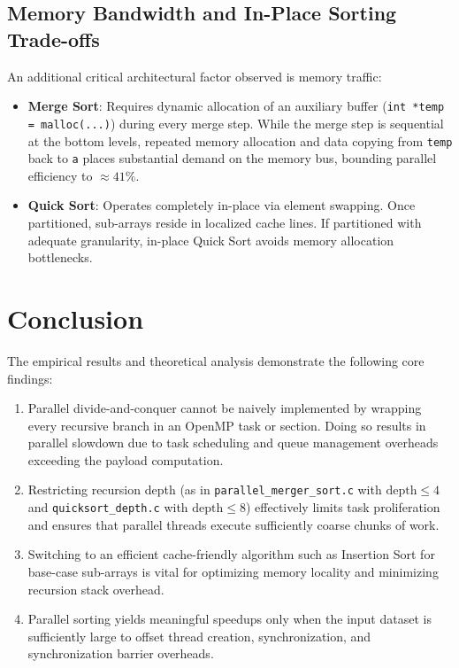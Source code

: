 \documentclass[12pt]{article}
\begin{document}
\subsection{Memory Bandwidth and In-Place Sorting Trade-offs}
An additional critical architectural factor observed is memory traffic:
\begin{itemize}
    \item \textbf{Merge Sort}: Requires dynamic allocation of an auxiliary buffer (\texttt{int *temp = malloc(...)}) during every merge step. While the merge step is sequential at the bottom levels, repeated memory allocation and data copying from \texttt{temp} back to \texttt{a} places substantial demand on the memory bus, bounding parallel efficiency to $\approx 41\%$.
    \item \textbf{Quick Sort}: Operates completely in-place via element swapping. Once partitioned, sub-arrays reside in localized cache lines. If partitioned with adequate granularity, in-place Quick Sort avoids memory allocation bottlenecks.
\end{itemize}

\section{Conclusion}
The empirical results and theoretical analysis demonstrate the following core findings:
\begin{enumerate}
    \item Parallel divide-and-conquer cannot be naively implemented by wrapping every recursive branch in an OpenMP task or section. Doing so results in parallel slowdown due to task scheduling and queue management overheads exceeding the payload computation.
    \item Restricting recursion depth (as in \texttt{parallel\_merger\_sort.c} with $\text{depth} \le 4$ and \texttt{quicksort_depth.c} with $\text{depth} \le 8$) effectively limits task proliferation and ensures that parallel threads execute sufficiently coarse chunks of work.
    \item Switching to an efficient cache-friendly algorithm such as Insertion Sort for base-case sub-arrays is vital for optimizing memory locality and minimizing recursion stack overhead.
    \item Parallel sorting yields meaningful speedups only when the input dataset is sufficiently large to offset thread creation, synchronization, and synchronization barrier overheads.
\end{enumerate}
\end{document}
